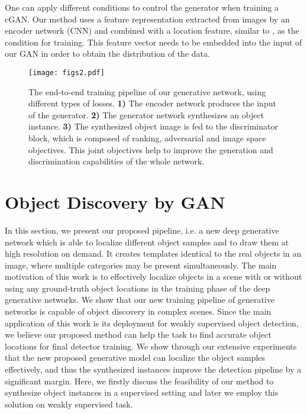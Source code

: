 \documentclass[runningheads]{llncs}
\begin{document}
One can apply different conditions  to control the generator when training a cGAN.  Our method uses a feature representation extracted from images by an encoder network (CNN) and combined with a location feature, similar to \cite{dosovitskiy2,pathak}, as the condition for training. This feature vector needs to be embedded into the input of our GAN in order to obtain the distribution of the data.  

\begin{figure*}[t]
 \centering
 \texttt{[image: figs2.pdf]}
 \caption{The end-to-end training pipeline of our generative network, using different types of losses. \textbf{1)} The encoder network produces the input of the generator. \textbf{2)} The generator network synthesizes an object instance. \textbf{3)} The synthesized object image is fed to the discriminator block,  which is composed of ranking, adversarial and image space objectives. This joint objectives help to improve the generation and discrimination capabilities of the whole network.}
\label{fig:pipeline}
\end{figure*}


\section{Object Discovery by GAN} \label{sec:method}

In this section, we present our proposed pipeline, i.e. a new deep generative network which is able to localize different object samples and to draw them at high resolution on demand. It creates templates identical to the real objects in an image, where multiple categories may be present simultaneously. The main motivation of this work is to effectively localize objects in a scene with or without using any ground-truth object locations in the training phase of the deep generative networks. We show that our new training pipeline of generative networks is capable of object discovery in complex scenes. Since the main application of this work is its deployment for  weakly supervised object detection, we believe our proposed method can help the task to find accurate object locations for final detector training. We show through our extensive experiments that the new proposed generative model can localize the object samples effectively, and thus the synthesized instances improve the detection pipeline by a significant margin. Here, we firstly discuss the feasibility of our method to synthesize object instances in a supervised setting and later we employ this solution on weakly supervised task.
\end{document}
